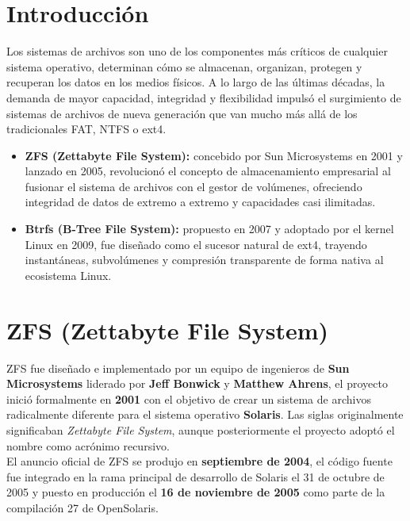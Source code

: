 \documentclass[12pt,letterpaper]{article}
\begin{document}


\newpage

\section{Introducción}
Los sistemas de archivos son uno de los componentes más críticos de cualquier sistema operativo, determinan cómo
se almacenan, organizan, protegen y recuperan los datos en los medios físicos. A lo largo de las últimas décadas,
la demanda de mayor capacidad, integridad y flexibilidad impulsó el surgimiento de sistemas de archivos de nueva
generación que van mucho más allá de los tradicionales FAT, NTFS o ext4.\\

\begin{itemize}
\item \textbf{ZFS (Zettabyte File System):} concebido por Sun Microsystems en 2001 y lanzado en 2005, revolucionó
  el concepto de almacenamiento empresarial al fusionar el sistema de archivos con el gestor de volúmenes,
  ofreciendo integridad de datos de extremo a extremo y capacidades casi ilimitadas.
\item \textbf{Btrfs (B-Tree File System):} propuesto en 2007 y adoptado por el kernel Linux en 2009, fue diseñado
  como el sucesor natural de ext4, trayendo instantáneas, subvolúmenes y compresión transparente de forma nativa
  al ecosistema Linux.
\end{itemize}

\section{ZFS (Zettabyte File System)}
ZFS fue diseñado e implementado por un equipo de ingenieros de \textbf{Sun Microsystems} liderado por
\textbf{Jeff Bonwick} y \textbf{Matthew Ahrens}, el proyecto inició formalmente en \textbf{2001} con el objetivo
de crear un sistema de archivos radicalmente diferente para el sistema operativo \textbf{Solaris}. Las siglas
originalmente significaban \emph{Zettabyte File System}, aunque posteriormente el proyecto adoptó el nombre como
acrónimo recursivo.\\

El anuncio oficial de ZFS se produjo en \textbf{septiembre de 2004}, el código fuente fue integrado en la rama
principal de desarrollo de Solaris el 31 de octubre de 2005 y puesto en producción el
\textbf{16 de noviembre de 2005} como parte de la compilación 27 de OpenSolaris.
\end{document}
